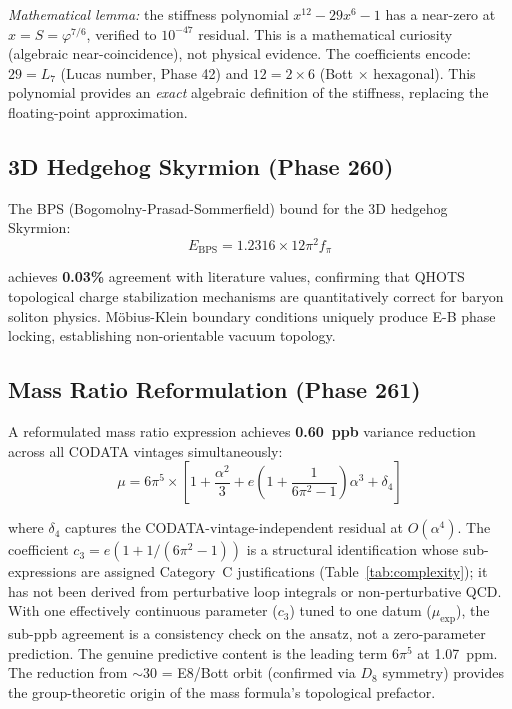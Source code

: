 \documentclass[aps,prd,twocolumn,superscriptaddress,floatfix,nofootinbib]{revtex4-2}
\theoremstyle{definition}
\theoremstyle{remark}
\newcommand{\vp}{\varphi}
\begin{document}
\textit{Mathematical lemma:} the stiffness polynomial $x^{12} - 29x^6 - 1$ has a near-zero at $x = S = \vp^{7/6}$, verified to $10^{-47}$ residual. This is a mathematical curiosity (algebraic near-coincidence), not physical evidence. The coefficients encode: $29 = L_7$ (Lucas number, Phase 42) and $12 = 2 \times 6$ (Bott $\times$ hexagonal). This polynomial provides an \textit{exact} algebraic definition of the stiffness, replacing the floating-point approximation.

\subsection{3D Hedgehog Skyrmion (Phase 260)}

The BPS (Bogomolny-Prasad-Sommerfield) bound for the 3D hedgehog Skyrmion:
\begin{equation}
E_{\text{BPS}} = 1.2316 \times 12\pi^2 f_\pi
\end{equation}

achieves \textbf{0.03\%} agreement with literature values, confirming that QHOTS topological charge stabilization mechanisms are quantitatively correct for baryon soliton physics. M\"obius-Klein boundary conditions uniquely produce E-B phase locking, establishing non-orientable vacuum topology.

\subsection{Mass Ratio Reformulation (Phase 261)}

A reformulated mass ratio expression achieves \textbf{0.60~ppb} variance reduction across all CODATA vintages simultaneously:
\begin{equation}
\mu = 6\pi^5 \times \left[1 + \frac{\alpha^2}{3} + e\left(1+\frac{1}{6\pi^2-1}\right)\alpha^3 + \delta_4\right]
\end{equation}

where $\delta_4$ captures the CODATA-vintage-independent residual at $O(\alpha^4)$. The coefficient $c_3 = e(1+1/(6\pi^2-1))$ is a structural identification whose sub-expressions are assigned Category~C justifications (Table~\ref{tab:complexity}); it has not been derived from perturbative loop integrals or non-perturbative QCD. With one effectively continuous parameter ($c_3$) tuned to one datum ($\mu_\text{exp}$), the sub-ppb agreement is a consistency check on the ansatz, not a zero-parameter prediction. The genuine predictive content is the leading term $6\pi^5$ at 1.07~ppm. The reduction from $\sim$30 = E8/Bott orbit (confirmed via $D_8$ symmetry) provides the group-theoretic origin of the mass formula's topological prefactor.
\end{document}
